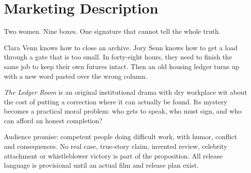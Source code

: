 \section{Marketing Description}
Two women. Nine boxes. One signature that cannot tell the whole truth.

Clara Venn knows how to close an archive. Jory Senn knows how to get a load through a gate that is too small. In forty-eight hours, they need to finish the same job to keep their own futures intact. Then an old housing ledger turns up with a new word pasted over the wrong column.

\emph{The Ledger Room} is an original institutional drama with dry workplace wit about the cost of putting a correction where it can actually be found. Its mystery becomes a practical moral problem: who gets to speak, who must sign, and who can afford an honest completion?

Audience promise: competent people doing difficult work, with humor, conflict and consequences. No real case, true-story claim, invented review, celebrity attachment or whistleblower victory is part of the proposition. All release language is provisional until an actual film and release plan exist.
